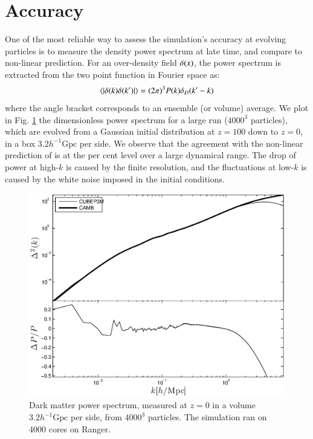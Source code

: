 \section{Accuracy}
\label{sec:accuracy}
 
One of the most reliable way to assess the simulation's accuracy at evolving particles
is to measure the density power spectrum at late time, and compare to non-linear prediction. 
For an over-density field $\delta({\bf \it x})$, the power spectrum is extracted from the two point function in Fourier space as:
\begin{eqnarray}
\langle | \delta ({\bf \it k}) \delta ({\bf \it k'}) | \rangle = (2\pi)^{3}P(k)\delta_{D}({\bf \it k'} - {\bf \it k})
\label{eq:power}
\end{eqnarray}
where the angle bracket corresponds to an ensemble (or volume) average.
We plot in Fig. \ref{fig:power_highres} the dimensionless power spectrum for a large run ($4000^3$ particles),
which are evolved from a Gaussian initial distribution at $z=100$ down to $z=0$, in a box $3.2 h^{-1}\mbox{Gpc}$ per side.
We observe that the agreement with the non-linear prediction of \cite{Lewis:1999bs} is at the per cent level over a large dynamical range.
The drop of power at high-$k$ is caused by the finite resolution, and the fluctuations at low-$k$ is caused by the white noise imposed
in the initial conditions. 

\begin{figure}%
  \begin{center}
    \includegraphics[width=5.2in]{graphs/power_highres.eps}
  \caption{Dark matter power spectrum, measured at $z=0$ in a volume $3.2 h^{-1}\mbox{Gpc}$ per side,
  from $4000^3$ particles. The simulation ran on 4000 cores on Ranger.
    \label{fig:power_highres}}
\end{center}
\end{figure}


